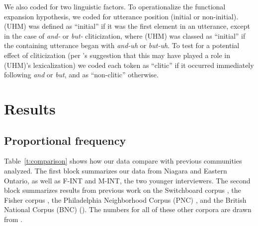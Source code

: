 \documentclass[11pt]{article}
\begin{document}
We also coded for two linguistic factors.
To operationalize the functional expansion hypothesis, we coded for utterance
position (initial or non-initial).
(UHM) was defined as ``initial'' if it was the first element in an utterance,
except in the case of \emph{and-} or \emph{but-} cliticization, where (UHM) was
classed as ``initial'' if the containing utterance began with \emph{and-uh} or
\emph{but-uh}.
To test for a potential effect of cliticization (per \citeauthor{tottie2017}'s
\citeyear{tottie2017} suggestion that this may have played a role in (UHM)'s
lexicalization) we coded each token as ``clitic'' if it occurred immediately
following \emph{and} or \emph{but}, and as ``non-clitic'' otherwise.

\section{Results}

\subsection{Proportional frequency}

Table~\ref{t:comparison} shows how our data compare with previous communities
analyzed.
The first block summarizes our data from Niagara and Eastern Ontario, as well as
F-INT and M-INT, the two younger interviewers.
The second block summarizes results from previous work on the Switchboard corpus
\parencite{switchboard}, the Fisher corpus \parencite{fisher}, the Philadelphia
Neighborhood Corpus (PNC) \parencite{labovrosenfelder2011}, and the British
National Corpus (BNC) (\citeyear{bnc}).
The numbers for all of these other corpora are drawn from
\textcite{wielingetal2016}.
\end{document}
